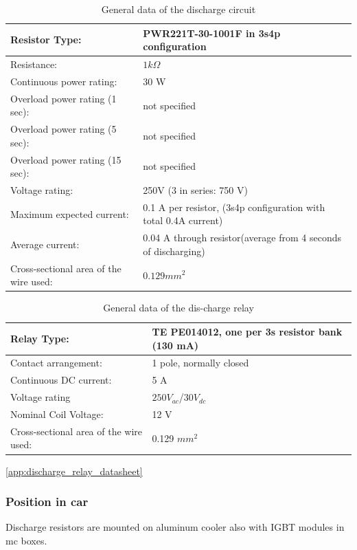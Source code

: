 \begin{table}[H]
	\centering
	\caption{General data of the discharge circuit}
	\begin{tabularx}{\textwidth}{|X|X|}
		\hline
		Resistor Type: & PWR221T-30-1001F in 3s4p configuration \\[\TableSize]
		\hline
		Resistance: & $1 k\Omega$ \\[\TableSize]
		\hline
		Continuous power rating: & 30 W \\[\TableSize]
		\hline
		Overload power rating (1 sec): & not specified \\[\TableSize]
		\hline
		Overload power rating (5 sec): & not specified \\[\TableSize]
		\hline
		Overload power rating (15 sec): & not specified \\[\TableSize]
		\hline
		Voltage rating: & 250V (3 in series: 750 V) \\[\TableSize]
		\hline
		Maximum expected current: & 0.1 A per resistor, (3s4p configuration with total 0.4A current) \\[\TableSize]
		\hline
		Average current: & 0.04 A through resistor(average from 4 seconds of discharging) \\[\TableSize]
		\hline
		Cross-sectional area of the wire used: & $0.129 mm^2$ \\[\TableSize]
		\hline
	\end{tabularx}%
	\label{tab:dischrage-circ}%
\end{table}%

\begin{table}[H]
	\centering
	\caption{General data of the dis-charge relay}
	\begin{tabularx}{\textwidth}{|X|X|}
		\hline
		Relay Type: & TE PE014012, one per 3s resistor bank (130 mA)\\[\TableSize]
		\hline
		Contact arrangement: & 1 pole, normally closed  \\[\TableSize]
		\hline
		Continuous DC current: & 5 A \\[\TableSize]
		\hline
		Voltage rating  & $250 V_{ac}$/$30 V_{dc}$ \footnotemark \\[\TableSize]
		\hline
		Nominal Coil Voltage:  & 12 V\\[\TableSize]
		\hline
		Cross-sectional area of the wire used: & 0.129 $mm^2$ \\[\TableSize]
		\hline
	\end{tabularx}%
	\label{tab:discharge-relay}%
\end{table}%

\ref{app:discharge_relay_datasheet}



\subsubsection{Position in car}

Discharge resistors are mounted on aluminum cooler also with IGBT modules in \gls{mc} boxes.